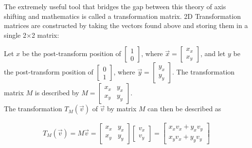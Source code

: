 \documentclass[12pt, a4paper]{article}
\begin{document}
\pagebreak

The extremely useful tool that bridges the gap between this theory of axis
shifting and mathematics is called a transformation matrix. 2D Transformation
matrices are constructed by taking the vectors found above and storing them in a
single 2$\times$2 matrix:

Let $x$ be the post-transform position of $\begin{bmatrix} 1 \\ 0
    \end{bmatrix}$, where $\vec{x} = \begin{bmatrix} x_x \\ x_y
    \end{bmatrix}$, and let $y$ be the post-transform position of
$\begin{bmatrix} 0 \\ 1 \end{bmatrix}$, where $\vec{y} =
    \begin{bmatrix}y_x \\ y_y \end{bmatrix}$. The transformation matrix
$M$ is described by $ M = \begin{bmatrix} x_x & y_x \\
                x_y & y_y
    \end{bmatrix}$.\\

The transformation $T_M(\vec{v})$ of $\vec{v}$ by matrix $M$ can then be
described as

\begin{align*}
    T_M(\vec{v}) = M\vec{v} = 
    \begin{bmatrix}
        x_x & y_x \\
        x_y & y_y
    \end{bmatrix}
    \begin{bmatrix}
        v_x \\
        v_y
    \end{bmatrix}
    =
    \begin{bmatrix}
        x_xv_x + y_xv_y \\
        x_yv_x + y_yv_y
    \end{bmatrix}
\end{align*}
\end{document}
